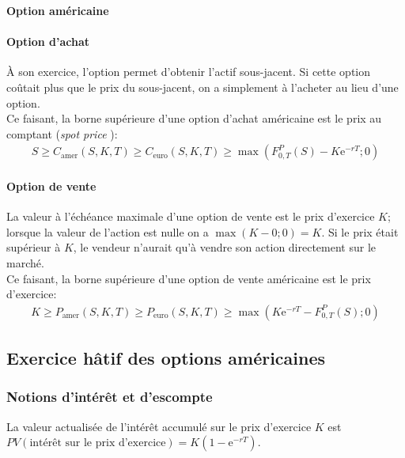 \documentclass[10pt, french]{article}
\begin{document}
\begin{multicols*}{2}
\begin{center}
	\textbf{Option américaine}
\end{center}

\paragraph{Option d'achat}
À son exercice, l'option permet d'obtenir l'actif sous-jacent. Si cette option coûtait plus que le prix du sous-jacent, on a simplement à l'acheter au lieu d'une option.\\

Ce faisant, \textcolor{cobalt}{la borne supérieure d'une option d'achat américaine est le prix au comptant (\og \textit{spot price} \fg{})}:
\begin{align*}
	S	
	\geq	C_{\text{amer}}(S, K, T)
	\geq	C_{\text{euro}}(S, K, T)
	\geq	\max\left(F_{0, T}^{P}(S) - K\textrm{e}^{-rT}; 0\right)
\end{align*}

\paragraph{Option de vente}
La valeur à l'échéance maximale d'une option de vente est le prix d'exercice $K$; lorsque la valeur de l'action est nulle on a $\max(K - 0; 0) = K$. Si le prix était supérieur à $K$, le vendeur n'aurait qu'à vendre son action directement sur le marché. \\

Ce faisant, \textcolor{cobalt}{la borne supérieure d'une option de vente américaine est le prix d'exercice}:
\begin{align*}
	K	
	\geq	P_{\text{amer}}(S, K, T)
	\geq	P_{\text{euro}}(S, K, T)
	\geq	\max\left(K\textrm{e}^{-rT} - F_{0, T}^{P}(S); 0\right)	
\end{align*}


\columnbreak
\subsection{Exercice hâtif des options américaines}
\subsubsection*{Notions d'intérêt et d'escompte}
La valeur actualisée de l'intérêt accumulé sur le prix d'exercice $K$ est $PV(\text{intérêt sur le prix d'exercice}) = K(1 - \textrm{e}^{-rT})$.\\


\end{multicols*}
\end{document}
